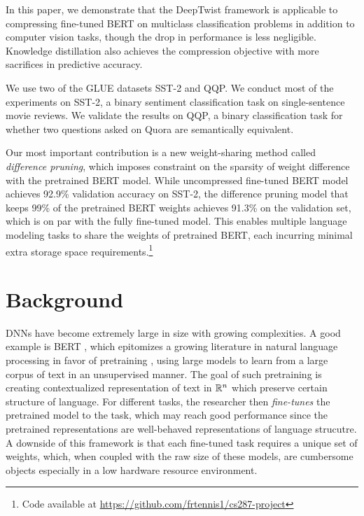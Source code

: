 \documentclass[10pt]{article}
\begin{document}
In this paper, we demonstrate that the DeepTwist framework
\citep{lee2018deeptwist} is applicable to compressing fine-tuned BERT
\citep{devlin2018bert} on multiclass classification problems in addition to
computer vision tasks, though the drop in performance is less negligible.
Knowledge distillation also achieves the compression objective with more
sacrifices in  predictive accuracy.

We use two of the GLUE datasets SST-2 and QQP. We conduct most of the
experiments
on SST-2, a binary sentiment classification task on single-sentence movie
reviews. We validate the results on QQP, a binary classification task for
whether two questions asked on Quora are semantically equivalent.

Our most important contribution is a new weight-sharing method called
\emph{difference pruning}, which imposes constraint on the sparsity of weight
difference with the pretrained BERT model. While uncompressed fine-tuned BERT
model achieves 92.9\% validation accuracy on SST-2, the difference pruning model
that keeps 99\% of the pretrained BERT weights achieves 91.3\% on the validation
set, which is on par with the fully fine-tuned model. This enables multiple
language modeling tasks to share the weights of pretrained BERT, each incurring
minimal extra storage space requirements.\footnote{Code available at \url{https://github.com/frtennis1/cs287-project}}

\section{Background}

DNNs have become extremely large in size with growing complexities. A good
example is BERT \citep{devlin2018bert}, which epitomizes a growing
literature in natural language processing in favor of pretraining 
\citep{peters2018deep,radford2018improving,radford2019language},
using large models to learn from a large corpus of text in an unsupervised
manner. The goal of such pretraining is creating contextualized
representation of text in $\mathbb{R}^n$ which preserve certain structure of
language. For different tasks, the researcher then \emph{fine-tunes} the
pretrained model to the task, which may reach good performance since the
pretrained representations are well-behaved representations of language
strucutre. A downside of this framework is that each fine-tuned task
requires a unique set of weights, which, when coupled with the raw size of
these models, are cumbersome objects especially in a low hardware resource
environment.
\end{document}

